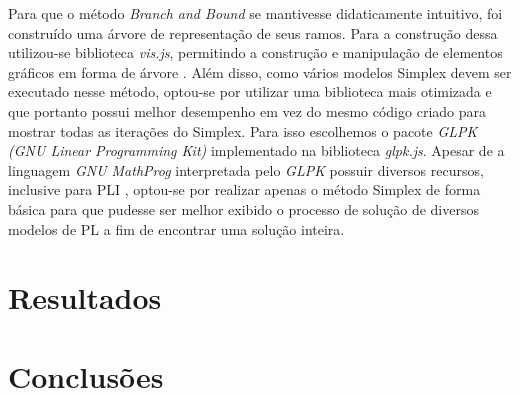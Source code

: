 \documentclass [11pt]{articleSBPO}
\begin{document}
Para que o método \textit{Branch and Bound} se mantivesse didaticamente intuitivo, foi construído uma árvore de representação de seus ramos. Para a construção dessa utilizou-se biblioteca \textit{vis.js}, permitindo a construção e manipulação de elementos gráficos em forma de árvore \cite{vis}. Além disso, como vários modelos Simplex devem ser executado nesse método, optou-se por utilizar uma biblioteca mais otimizada e que portanto possui melhor desempenho em vez do mesmo código criado para mostrar todas as iterações do Simplex. Para isso escolhemos o pacote \textit{GLPK (GNU Linear Programming Kit)} implementado na biblioteca \textit{glpk.js}. Apesar de a linguagem \textit{GNU MathProg} interpretada pelo \textit{GLPK} possuir diversos recursos, inclusive para PLI \cite{mathprog}, optou-se por realizar apenas o método Simplex de forma básica para que pudesse ser melhor exibido o processo de solução de diversos modelos de PL a fim de encontrar uma solução inteira.

\section{Resultados}\label{sec:resultados}


\section{Conclusões}\label{sec:conclusao}




\end{document}
